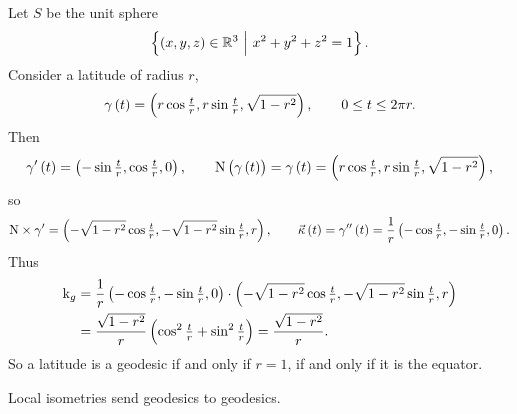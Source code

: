 \begin{example*}
Let $ S $ be the unit sphere
$$ \cbr{\br{x, y,z} \in \RR^3 \st x^2 + y^2 + z^2 = 1}. $$
Consider a latitude of radius $ r $,
$$ \gamma\br{t} = \br{r\cos \tfrac{t}{r}, r\sin \tfrac{t}{r}, \sqrt{1 - r^2}}, \qquad 0 \le t \le 2\pi r. $$
Then
$$ \gamma'\br{t} = \br{-\sin \tfrac{t}{r}, \cos \tfrac{t}{r}, 0}, \qquad \N\br{\gamma\br{t}} = \gamma\br{t} = \br{r\cos \tfrac{t}{r}, r\sin \tfrac{t}{r}, \sqrt{1 - r^2}}, $$
so
$$ \N \times \gamma' = \br{-\sqrt{1 - r^2}\cos \tfrac{t}{r}, -\sqrt{1 - r^2}\sin \tfrac{t}{r}, r}, \qquad \vec{\kappa}\br{t} = \gamma''\br{t} = \dfrac{1}{r}\br{-\cos \tfrac{t}{r}, -\sin \tfrac{t}{r}, 0}. $$
Thus
\begin{align*}
\k_g
& = \dfrac{1}{r}\br{-\cos \tfrac{t}{r}, -\sin \tfrac{t}{r}, 0} \cdot \br{-\sqrt{1 - r^2}\cos \tfrac{t}{r}, -\sqrt{1 - r^2}\sin \tfrac{t}{r}, r} \\
& = \dfrac{\sqrt{1 - r^2}}{r}\br{\cos^2 \tfrac{t}{r} + \sin^2 \tfrac{t}{r}}
= \dfrac{\sqrt{1 - r^2}}{r}.
\end{align*}
So a latitude is a geodesic if and only if $ r = 1 $, if and only if it is the equator.
\end{example*}

\pagebreak

\begin{proposition}
Local isometries send geodesics to geodesics.
\end{proposition}

